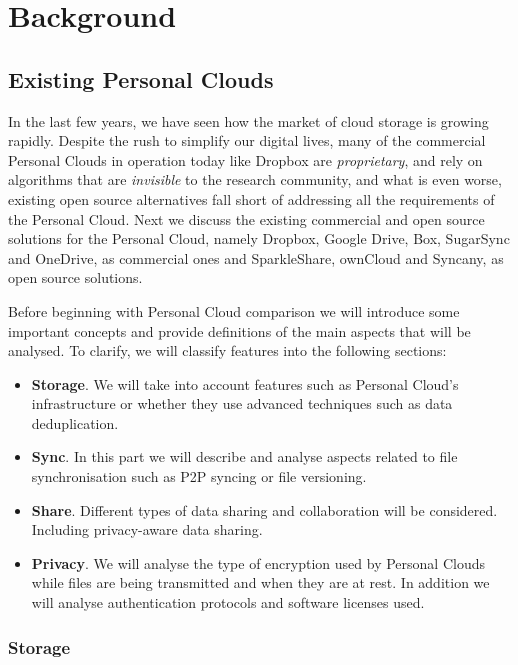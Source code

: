 \chapter{Background}

\section{Existing Personal Clouds}

In the last few years, we have seen how the market of cloud storage is growing rapidly. 
Despite the rush to simplify our digital lives, many of the commercial Personal Clouds
in operation today like Dropbox are \textit{proprietary}, and rely on algorithms that are
\textit{invisible} to the research community, and what is even worse, existing open source
alternatives fall short of addressing all the requirements of the Personal Cloud.
Next we discuss the existing commercial and open source solutions for the Personal Cloud, namely
Dropbox, Google Drive, Box, SugarSync and OneDrive, as commercial ones and 
SparkleShare, ownCloud and Syncany, as open source solutions.

Before beginning with Personal Cloud comparison we will introduce some important concepts
and provide definitions of the main aspects that will be analysed. To clarify, we will
classify features into the following sections:

\begin{itemize}
\item \textbf{Storage}. We will take into account features such as Personal Cloud's infrastructure or whether they use advanced techniques such as data deduplication.
\item \textbf{Sync}. In this part we will describe and analyse aspects related to file synchronisation such as P2P syncing or file versioning. 
\item \textbf{Share}. Different types of data sharing and collaboration will be considered. Including privacy-aware data sharing.
\item \textbf{Privacy}. We will analyse the type of encryption used by Personal Clouds while files are being transmitted and when they are at rest. In addition we will analyse authentication protocols and software licenses used.
\end{itemize}


\subsection{Storage}

